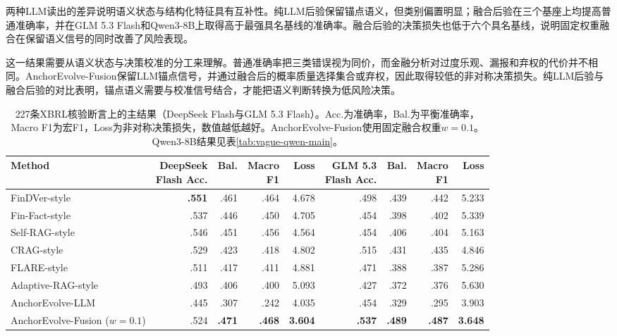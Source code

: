 两种LLM读出的差异说明语义状态与结构化特征具有互补性。纯LLM后验保留锚点语义，但类别偏置明显；融合后验在三个基座上均提高普通准确率，并在GLM 5.3 Flash和Qwen3-8B上取得高于最强具名基线的准确率。融合后验的决策损失也低于六个具名基线，说明固定权重融合在保留语义信号的同时改善了风险表现。

这一结果需要从语义状态与决策校准的分工来理解。普通准确率把三类错误视为同价，而金融分析对过度乐观、漏报和弃权的代价并不相同。AnchorEvolve-Fusion保留LLM锚点信号，并通过融合后的概率质量选择集合或弃权，因此取得较低的非对称决策损失。纯LLM后验与融合后验的对比表明，锚点语义需要与校准信号结合，才能把语义判断转换为低风险决策。

\begin{table}[t]
\centering
{}
\setlength{\tabcolsep}{2pt}
\caption{227条XBRL核验断言上的主结果（DeepSeek Flash与GLM 5.3 Flash）。Acc.为准确率，Bal.为平衡准确率，Macro F1为宏F1，Loss为非对称决策损失，数值越低越好。AnchorEvolve-Fusion使用固定融合权重$w=0.1$。Qwen3-8B结果见表\ref{tab:vague-qwen-main}。}
\label{tab:vague}
\begin{tabular}{lrrrrrrrr}
\toprule
Method & \shortstack{DeepSeek\\Flash Acc.} & Bal. & \shortstack{Macro\\F1} & Loss & \shortstack{GLM 5.3\\Flash Acc.} & Bal. & \shortstack{Macro\\F1} & Loss \\
\midrule
FinDVer-style & \textbf{.551} & .461 & .464 & 4.678 & .498 & .439 & .442 & 5.233 \\
Fin-Fact-style & .537 & .446 & .450 & 4.705 & .454 & .398 & .402 & 5.339 \\
Self-RAG-style & .546 & .451 & .456 & 4.564 & .454 & .406 & .404 & 5.163 \\
CRAG-style & .529 & .423 & .418 & 4.802 & .515 & .431 & .435 & 4.846 \\
FLARE-style & .511 & .417 & .411 & 4.881 & .471 & .388 & .387 & 5.286 \\
Adaptive-RAG-style & .493 & .406 & .400 & 5.093 & .427 & .372 & .376 & 5.630 \\
\midrule
AnchorEvolve-LLM & .445 & .307 & .242 & 4.035 & .454 & .329 & .295 & 3.903 \\
AnchorEvolve-Fusion ($w=0.1$) & .524 & \textbf{.471} & \textbf{.468} & \textbf{3.604} & \textbf{.537} & \textbf{.489} & \textbf{.487} & \textbf{3.648} \\
\bottomrule
\end{tabular}
\end{table}

